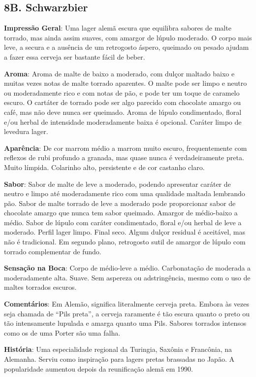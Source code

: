 \subsection*{8B. Schwarzbier}
\textbf{Impressão Geral}: Uma lager alemã escura que equilibra sabores de malte torrado, mas ainda assim suaves, com amargor de lúpulo moderado. O corpo mais leve, a secura e a ausência de um retrogosto áspero, queimado ou pesado ajudam a fazer essa cerveja ser bastante fácil de beber.

\textbf{Aroma}: Aroma de malte de baixo a moderado, com dulçor maltado baixo e muitas vezes notas de malte torrado aparentes. O malte pode ser limpo e neutro ou moderadamente rico e com notas de pão, e pode ter um toque de caramelo escuro. O cartáter de torrado pode ser algo parecido com chocolate amargo ou café, mas não deve nunca ser queimado. Aroma de lúpulo condimentado, floral e/ou herbal de intensidade moderadamente baixa é opcional. Caráter limpo de levedura lager.

\textbf{Aparência}: De cor marrom médio a marrom muito escuro, frequentemente com reflexos de rubi profundo a granada, mas quase nunca é verdadeiramente preta. Muito límpida. Colarinho alto, persistente e de cor castanho claro.

\textbf{Sabor}: Sabor de malte de leve a moderado, podendo apresentar caráter de neutro e limpo até moderadamente rico com uma qualidade maltada lembrando pão. Sabor de malte torrado de leve a moderado pode proporcionar sabor de chocolate amargo que nunca tem sabor queimado. Amargor de médio-baixo a médio. Sabor de lúpulo com caráter condimentado, floral e/ou herbal de leve a moderado. Perfil lager limpo. Final seco. Algum dulçor residual é aceitável, mas não é tradicional. Em segundo plano, retrogosto sutil de amargor de lúpulo com torrado complementar de fundo.

\textbf{Sensação na Boca}: Corpo de médio-leve a médio. Carbonatação de moderada a moderadamente alta. Suave. Sem aspereza ou adstringência, mesmo com o uso de maltes torrados escuros.

\textbf{Comentários}: Em Alemão, significa literalmente cerveja preta. Embora às vezes seja chamada de “Pils preta”, a cerveja raramente é tão escura quanto o preto ou tão intensamente lupulada e amarga quanto uma Pils. Sabores torrados intensos como os de uma Porter são uma falha.

\textbf{História}: Uma especialidade regional da Turingia, Saxônia e Francônia, na Alemanha. Serviu como inspiração para lagers pretas brassadas no Japão. A popularidade aumentou depois da reunificação alemã em 1990.

